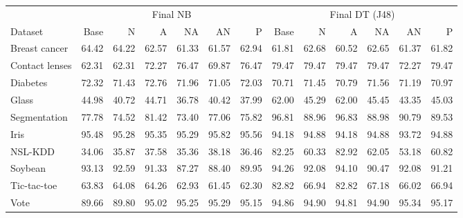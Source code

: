 \begin{tabular}{lrrrrrrrrrrrr}
\toprule
 & \multicolumn{6}{c}{Final NB} & \multicolumn{6}{c}{Final DT (J48)} \\
\cmidrule(lr){2-7}\cmidrule(lr){8-13}
Dataset & Base & N & A & NA & AN & P & Base & N & A & NA & AN & P \\
\midrule
Breast cancer & 64.42 & 64.22 & 62.57 & 61.33 & 61.57 & 62.94 & 61.81 & 62.68 & 60.52 & 62.65 & 61.37 & 61.82 \\
Contact lenses & 62.31 & 62.31 & 72.27 & 76.47 & 69.87 & 76.47 & 79.47 & 79.47 & 79.47 & 79.47 & 72.27 & 79.47 \\
Diabetes & 72.32 & 71.43 & 72.76 & 71.96 & 71.05 & 72.03 & 70.71 & 71.45 & 70.79 & 71.56 & 71.19 & 70.97 \\
Glass & 44.98 & 40.72 & 44.71 & 36.78 & 40.42 & 37.99 & 62.00 & 45.29 & 62.00 & 45.45 & 43.35 & 45.03 \\
Segmentation & 77.78 & 74.52 & 81.42 & 73.40 & 77.06 & 75.82 & 96.81 & 88.96 & 96.83 & 88.98 & 90.79 & 89.53 \\
Iris & 95.48 & 95.28 & 95.35 & 95.29 & 95.82 & 95.56 & 94.18 & 94.88 & 94.18 & 94.88 & 93.72 & 94.88 \\
NSL-KDD & 34.06 & 35.87 & 37.58 & 35.36 & 38.18 & 36.46 & 82.25 & 60.33 & 82.92 & 62.05 & 53.18 & 60.82 \\
Soybean & 93.13 & 92.59 & 91.33 & 87.27 & 88.40 & 89.95 & 94.26 & 92.08 & 94.10 & 90.47 & 92.08 & 91.21 \\
Tic-tac-toe & 63.83 & 64.08 & 64.26 & 62.93 & 61.45 & 62.30 & 82.82 & 66.94 & 82.82 & 67.18 & 66.02 & 66.94 \\
Vote & 89.66 & 89.80 & 95.02 & 95.25 & 95.29 & 95.15 & 94.86 & 94.90 & 94.81 & 94.90 & 95.34 & 95.17 \\
\bottomrule
\end{tabular}
